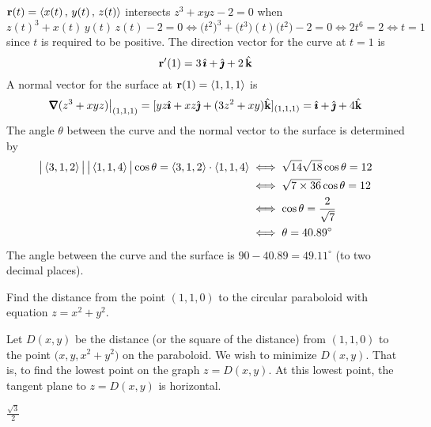 \begin{solution}
$\mathbf{r}(t)=\left< x(t)\,,\,y(t)\,,\,z(t)\right>$ intersects $z^3 + xyz -2 = 0$ when
\begin{equation*}
z(t)^3+x(t)\,y(t)\,z(t)-2=0\iff \big(t^2\big)^3 + \big(t^3)(t)\big(t^2\big)-2=0
\iff 2t^6=2\iff t=1
\end{equation*}
since $t$ is required to be positive.
The direction vector for the curve at $t=1$ is
\begin{equation*}
\mathbf{r}'(1)=3\,\hat{\pmb{\imath}}+\hat{\pmb{\jmath}}+2\,\hat{\mathbf{k}}
\end{equation*}
A normal vector for the surface at $\mathbf{r}(1)=\left< 1,1,1\right>$ is
\begin{equation*}
\vnabla(z^3+xyz)\big|_{(1,1,1)}=[yz\hi+xz\hj+(3z^2+xy)\hk]_{(1,1,1)}
=\hi+\hj+4\hk
\end{equation*}
The angle $\theta$ between the curve and the normal vector to the surface
is determined by
\begin{align*}
\big|\left< 3,1,2\right>\big|\,\big|\left< 1,1,4\right>\big|\cos\theta
             =\left< 3,1,2\right> \cdot\left< 1,1,4\right>
&\iff \sqrt{14}\sqrt{18}\cos\theta=12 \\
&\iff \sqrt{7\times 36}\cos\theta=12 \\
&\iff \cos\theta=\frac{2}{\sqrt{7}} \\
&\iff \theta=40.89^\circ
\end{align*}
The angle between the curve and the surface is 
$90-40.89=49.11^\circ$ (to two decimal places).
\end{solution}

\begin{question}
Find the distance from the point $(1,1,0)$ to the circular
paraboloid with equation $z=x^2+y^2$.
\end{question}

\begin{hint}
Let $D(x,y)$ be the distance (or the square of the distance) from $(1,1,0)$ 
to the point $\big(x,y, x^2+y^2)$ on the paraboloid. We wish to 
minimize $D(x,y)$. That is, to find the lowest point on the graph 
$z=D(x,y)$. At this lowest point, the tangent plane to $z=D(x,y)$ is 
horizontal.
\end{hint}

\begin{answer}
$\frac{\sqrt{3}}{2}$
\end{answer}

